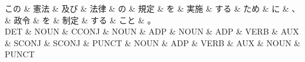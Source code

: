 \documentclass[tikz,border=5pt]{standalone}
\begin{document}
\normalsize
\begin{dependency}[edge unit distance=12.0pt]
    \begin{deptext}[column sep=1em]
        この \& 憲法 \& 及び \& 法律 \& の \& 規定 \& を \& 実施 \& する \& ため \& に \& 、 \& 政令 \& を \& 制定 \& する \& こと \& 。\\
        DET \& NOUN \& CCONJ \& NOUN \& ADP \& NOUN \& ADP \& VERB \& AUX \& SCONJ \& SCONJ \& PUNCT \& NOUN \& ADP \& VERB \& AUX \& NOUN \& PUNCT\\
    \end{deptext}
\end{dependency}
\end{document}
